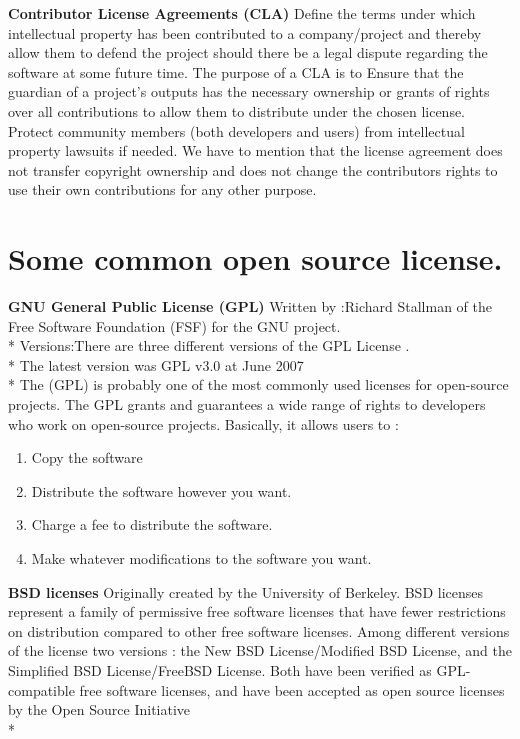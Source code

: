 \documentclass[11pt]{article} %
\begin{document}
{ \bf Contributor License Agreements (CLA)}
Define the terms under which intellectual property has been contributed to a company/project and thereby allow them to defend the project should there be a legal dispute regarding the software at some future time. 
The purpose of a CLA is to
 Ensure that the guardian of a project's outputs has the necessary ownership or grants of rights over all contributions to allow them to distribute under the chosen license.
Protect community members (both developers and users) from intellectual property lawsuits if needed.
We have to mention that the license agreement does not transfer copyright ownership and does not change the contributors rights to use their own contributions for any other purpose.
\section{Some common open source license.}

{\bf GNU General Public License (GPL)}
Written by :Richard Stallman of the Free Software Foundation (FSF) for the GNU project.
\\* 
Versions:There are three different versions of the GPL License .\\* 
The latest version was GPL v3.0 at June 2007\\* 
The (GPL) is probably one of the most commonly used licenses for open-source projects. The GPL grants and guarantees a wide range of rights to developers who work on open-source projects. Basically, it allows users to :
\begin{enumerate}
\item Copy the software
\item Distribute the software however you want.
\item Charge a fee to distribute the software.
\item Make whatever modifications to the software you want.
\end{enumerate}
 
{\bf BSD licenses}
 Originally created by the University of Berkeley. BSD licenses represent a family of permissive free software licenses that have fewer restrictions on distribution compared to other free software licenses.
 Among different versions of the license two versions : the New BSD License/Modified BSD License, and the Simplified BSD License/FreeBSD License. Both have been verified as GPL-compatible free software licenses, and have been accepted as open source licenses by the Open Source Initiative \\* 
\end{document}
